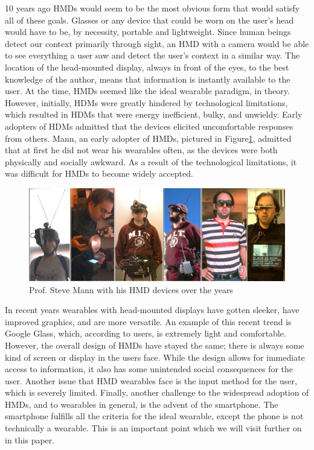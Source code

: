 \documentclass[11pt]{article}
\begin{document}
10 years ago HMDs would seem to be the most obvious form that would satisfy all of these goals. Glasses or any device that could be worn on the user's head would have to be, by necessity, portable and lightweight. Since human beings detect our context primarily through sight, an HMD with a camera would be able to see everything a user saw and detect the user's context in a similar way. The location of the head-mounted display, always in front of the eyes, to the best knowledge of the author, means that information is instantly available to the user. At the time, HMDs seemed like the ideal wearable paradigm, in theory. However, initially, HDMs were greatly hindered by technological limitations, which resulted in HDMs that were energy inefficient, bulky, and unwieldy\cite{fromCyborgsToGG}. Early adopters of HDMs admitted that the devices elicited uncomfortable responses from others. Mann, an early adopter of HMDs, pictured in Figure\ref{fig:Mann}, admitted that at first he did not wear his wearables often, as the devices were both physically and socially awkward\cite{smartClothingShift}.  As a result of the technological limitations, it was difficult for HMDs to become widely accepted.  

\begin{figure}[H] %
   \centering
   \includegraphics[width=5in]{Wearcompevolution2.jpg}       
   \caption{Prof. Steve Mann with his HMD devices over the years \cite{wearablesOverTime}}
   \label{fig:Mann}
\end{figure} 

In recent years wearables with head-mounted displays have gotten sleeker, have improved graphics, and are more versatile. An example of this recent trend is Google Glass, which, according to users, is extremely light and comfortable. However, the overall design of HMDs have stayed the same; there is always some kind of screen or display in the users face. While the design allows for immediate access to information, it also has some unintended social consequences for the user. Another issue that HMD wearables face is the input method for the user, which is severely limited. Finally, another challenge to the widespread adoption of HMDs, and to wearables in general, is the advent of the smartphone. The smartphone fulfills all the criteria for the ideal wearable, except the phone is not technically a wearable. This is an important point which we will visit further on in this paper. 
\end{document}
